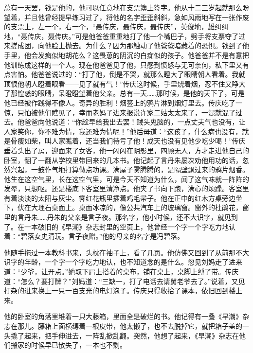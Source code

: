 \documentclass[UTF8]{ctexart}
\begin{document}
总有一天罢，钱是他的，他可以任意地在支票簿上签字。他从十二三岁起就那么盼望着，并且他曾经提早练习过了，将他的名字歪歪斜斜，急如风雨地写在一张作废的支票上，左一个，右一个，“聂传庆，聂传庆，聂传庆”，英俊地，雄纠纠地，“聂传庆，聂传庆。”可是他爸爸重重地打了他一个嘴巴子，劈手将支票夺了过来搓成团，向他脸上抛去。为什么？因为那触动了他爸爸暗藏着的恐惧。钱到了他手里，他会发疯似地胡花么？这畏葸的阴沉的白痴似的孩子。他爸爸并不是有意把他训练成这样的一个人。现在他爸爸见了他，只感到愤怒与无可奈何，私下里又有点害怕。他爸爸说过的：“打了他，倒是不哭，就那么瞪大了眼睛朝人看着。我就顶恨他朝人瞪着眼看——见了就有气！”传庆这时候，手里烧着烟，忍不住又睁大了那惶惑的眼睛，呆瞪瞪望着他父亲。总有一天……那时候，是他的天下了，可是他已经被作践得不像人。奇异的胜利！烟签上的鸦片淋到烟灯里去。传庆吃了一惊，只怕被他们瞧见了，幸而老妈子进来报说许家二姑太太来了，一混就混了过去。他爸爸向他说道：“你趁早给我出去罢！贼头鬼脑的，一点丈夫气也没有，让人家笑你，你不难为情，我还难为情呢！”他后母道：“这孩子，什么病也没有，就是骨瘦如柴，叫人家瞧着，还当我们待亏了他！成天也没有见他少吃少喝！”传庆垂着头出了房，迎面来了女客，他一闪闪在阴影里，四顾无人，方才走进他自己的卧室，翻了一翻从学校里带回来的几本书。他记起了言丹朱屡次劝他用功的话，忽然兴起，一鼓作气地打算做点功课。满屋子雾腾腾的，是隔壁飘过来的鸦片烟香。他生在这空气里，长在这空气里，可是今天不知道为什么，闻了这气味就一阵阵的发晕，只想呕。还是楼底下客室里清净点。他夹了书向下跑，满心的烦躁。客室里有着淡淡的太阳与灰尘。霁红花瓶里插着鸡毛帚子。他在正中的红木方桌旁边坐下，伏在大理石桌面上。桌面冰凉的，像公共汽车上的玻璃窗。窗外的杜鹃花，窗里的言丹朱……丹朱的父亲是言子夜。那名字，他小时候，还不大识字，就见到了。在一本破旧的《早潮》杂志封里的空页上，他曾经一个字一个字吃力地认着：“碧落女史清玩。言子夜赠。”他的母亲的名字是冯碧落。

他随手拖过一本教科书来，头枕在袖子上，看了几页。他仿佛又回到了从前那不大识字的年龄，一个字一个字吃力地认，也不知道念的是什么。忽见刘妈走了进来道：“少爷，让开点。”她取下肩上搭着的桌布，铺在桌上，桌脚上缚了带。传庆道：“怎么？要打牌？”刘妈道：“三缺一，打了电话去请舅老爷去了。”说着，又见打杂的进来换上一只一百支光的电灯泡子。传庆只得收拾了课本，依旧回到楼上来。

他的卧室的角落里堆着一只大藤箱，里面全是破烂的书。他记得有一叠《早潮》杂志在那儿。藤箱上面横缚着一根皮带，他太懒了，也不去脱掉它，就把箱子盖的一头撬了起来，把手伸进去，一阵乱掀乱翻。突然，他想了起来，《早潮》杂志在他们搬家的时候早已散失了，一本也不剩。
\end{document}
